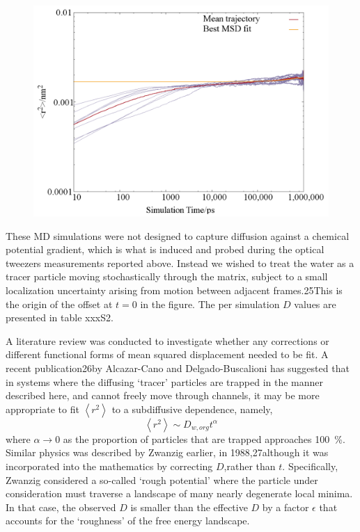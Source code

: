 \begin{figure}
    \centering
    \includegraphics{chapters/water_hopping/figures/Fig_S7.png}
    \label{fig:wat_msd}
\end{figure}

These MD simulations were not designed to capture diffusion against a chemical potential gradient, which is what is induced and probed during the optical tweezers measurements reported above. Instead we wished to treat the water as a tracer particle moving stochastically through the matrix, subject to a small localization uncertainty arising from motion between adjacent frames.25This is the origin of the offset at $t=0$ in the figure. The per simulation $D$ values are presented in table xxxS2. 

A literature review was conducted to investigate whether any corrections or different functional forms of mean squared displacement needed to be fit. A recent publication26by Alcazar-Cano and Delgado-Buscalioni has suggested that in systems where the diffusing ‘tracer’ particles are trapped in the manner described here, and cannot freely move through channels, it may be more appropriate to fit $\left\langle r^{2}\right\rangle$ to a subdiffusive dependence, namely, 
\begin{equation}
\left\langle r^{2}\right\rangle \sim D_{w, org} t^{\alpha}
\end{equation}
where $\alpha \rightarrow 0$ as the proportion of particles that are trapped approaches \SI{100}{\percent}. Similar physics was described by Zwanzig earlier, in 1988,27although it was incorporated into the mathematics by correcting $D$,rather than $t$. Specifically, Zwanzig considered a so-called `rough potential' where the particle under consideration must traverse a landscape of many nearly degenerate local minima. In that case, the observed $D$ is smaller than the effective $D$ by a factor $\epsilon$ that accounts for the `roughness' of the free energy landscape.

